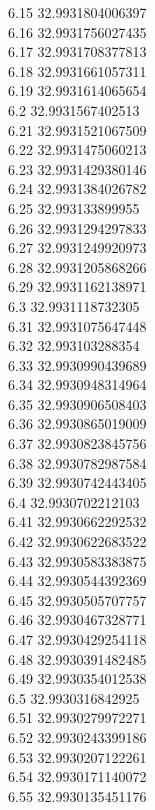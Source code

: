 {6.15	32.9931804006397\\
6.16	32.9931756027435\\
6.17	32.9931708377813\\
6.18	32.9931661057311\\
6.19	32.9931614065654\\
6.2	32.9931567402513\\
6.21	32.9931521067509\\
6.22	32.9931475060213\\
6.23	32.9931429380146\\
6.24	32.9931384026782\\
6.25	32.993133899955\\
6.26	32.9931294297833\\
6.27	32.9931249920973\\
6.28	32.9931205868266\\
6.29	32.9931162138971\\
6.3	32.9931118732305\\
6.31	32.9931075647448\\
6.32	32.993103288354\\
6.33	32.9930990439689\\
6.34	32.9930948314964\\
6.35	32.9930906508403\\
6.36	32.9930865019009\\
6.37	32.9930823845756\\
6.38	32.9930782987584\\
6.39	32.9930742443405\\
6.4	32.9930702212103\\
6.41	32.9930662292532\\
6.42	32.9930622683522\\
6.43	32.9930583383875\\
6.44	32.9930544392369\\
6.45	32.9930505707757\\
6.46	32.9930467328771\\
6.47	32.9930429254118\\
6.48	32.9930391482485\\
6.49	32.9930354012538\\
6.5	32.9930316842925\\
6.51	32.9930279972271\\
6.52	32.9930243399186\\
6.53	32.9930207122261\\
6.54	32.9930171140072\\
6.55	32.9930135451176\\
}
